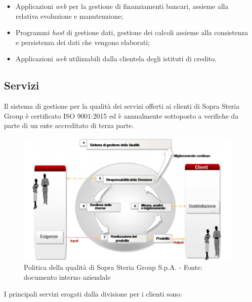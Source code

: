 	\begin{itemize}
		\item Applicazioni \textit{web} per la gestione di finanziamenti bancari, assieme alla relativa evoluzione e manutenzione;
		\item Programmi \textit{host} di gestione dati, gestione dei calcoli assieme alla consistenza e persistenza dei dati che vengono elaborati;
		\item Applicazioni \textit{web} utilizzabili dalla clientela degli istituti di credito.
	\end{itemize}
	
	\subsection{Servizi}
	
	Il sistema di gestione per la qualità dei servizi offerti ai clienti di Sopra Steria Group è certificato ISO 9001:2015 ed è annualmente sottoposto a verifiche da parte di un ente accreditato di terza parte.\\

	\begin{figure}[H]
	\centering
   	\includegraphics[width=1\textwidth]{immagini/ISO9001}
   	\caption{Politica della qualità di Sopra Steria Group S.p.A. - Fonte: documento interno aziendale}
	\end{figure}
	
	
	I principali servizi erogati dalla divisione per i clienti sono:
	
